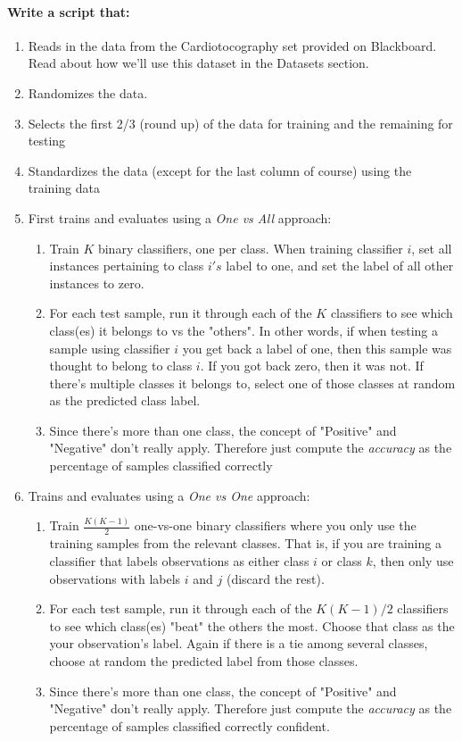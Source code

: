 \documentclass[12pt]{article}
\begin{document}
\paragraph{Write a script that:}
\begin{enumerate}
  \item Reads in the data from the Cardiotocography set provided on Blackboard.  Read about how we'll use this dataset in the Datasets section.
  \item Randomizes the data.
  \item Selects the first 2/3 (round up) of the data for training and the remaining for testing
  \item Standardizes the data (except for the last column of course) using the training data
  \item First trains and evaluates using a \emph{One vs All} approach:
    \begin{enumerate}
        \item Train $K$ binary classifiers, one per class.  When training classifier $i$, set all instances pertaining to class $i's$ label to one, and set the label of all other instances to zero.        \item For each test sample, run it through each of the $K$ classifiers to see which class(es) it belongs to vs the "others".  In other words, if when testing a sample using classifier $i$ you get back a label of one, then this sample was thought to belong to class $i$.  If you got back zero, then it was not.  If there's multiple classes it belongs to, select one of those classes at random as the predicted class label.
        \item Since there's more than one class, the concept of "Positive" and "Negative" don't really apply.  Therefore just compute the \emph{accuracy} as the percentage of samples classified correctly 
    \end{enumerate}
  \item Trains and evaluates using a \emph{One vs One} approach:
    \begin{enumerate}
        \item Train $\frac{K(K-1)}{2}$ one-vs-one binary classifiers where you only use the training samples from the relevant classes.  That is, if you are training a classifier that labels observations as either class $i$ or class $k$, then only use observations with labels $i$ and $j$ (discard the rest).
		\item For each test sample, run it through each of the $K(K-1)/2$ classifiers to see which class(es) "beat" the others the most.  Choose that class as the your observation's label.  Again if there is a tie among several classes, choose at random the predicted label from those classes.
        \item Since there's more than one class, the concept of "Positive" and "Negative" don't really apply.  Therefore just compute the \emph{accuracy} as the percentage of samples classified correctly  confident.
    \end{enumerate}
\end{enumerate}
\end{document}

